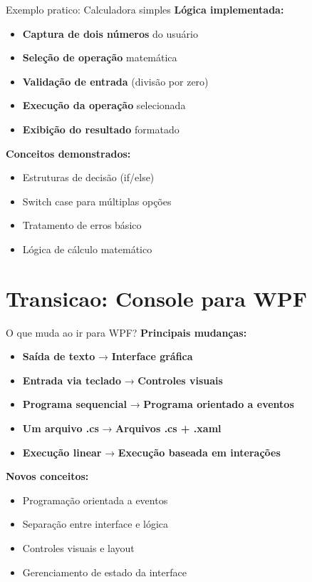 \documentclass[aspectratio=169]{beamer}
\begin{document}
\begin{frame}{Exemplo pratico: Calculadora simples}
\textbf{Lógica implementada:}
\begin{itemize}
    \item \textbf{Captura de dois números} do usuário
    \item \textbf{Seleção de operação} matemática
    \item \textbf{Validação de entrada} (divisão por zero)
    \item \textbf{Execução da operação} selecionada
    \item \textbf{Exibição do resultado} formatado
\end{itemize}

\textbf{Conceitos demonstrados:}
\begin{itemize}
    \item Estruturas de decisão (if/else)
    \item Switch case para múltiplas opções
    \item Tratamento de erros básico
    \item Lógica de cálculo matemático
\end{itemize}
\end{frame}

\section{Transicao: Console para WPF}

\begin{frame}{O que muda ao ir para WPF?}
\textbf{Principais mudanças:}
\begin{itemize}
    \item \textbf{Saída de texto} → \textbf{Interface gráfica}
    \item \textbf{Entrada via teclado} → \textbf{Controles visuais}
    \item \textbf{Programa sequencial} → \textbf{Programa orientado a eventos}
    \item \textbf{Um arquivo .cs} → \textbf{Arquivos .cs + .xaml}
    \item \textbf{Execução linear} → \textbf{Execução baseada em interações}
\end{itemize}

\textbf{Novos conceitos:}
\begin{itemize}
    \item Programação orientada a eventos
    \item Separação entre interface e lógica
    \item Controles visuais e layout
    \item Gerenciamento de estado da interface
\end{itemize}
\end{frame}
\end{document}
